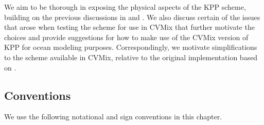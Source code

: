 We aim to be thorough in exposing the physical aspects of the KPP
scheme, building on the previous discussions in \cite{LargeKPP} and
\cite{Large2012}.  We also discuss certain of the issues that arose
when testing the scheme for use in CVMix that further motivate the
choices and provide suggestions for how to make use of the CVMix
version of KPP for ocean modeling purposes. Correspondingly, we
motivate simplifications to the scheme available in CVMix, relative to
the original implementation based on \cite{LargeKPP}.


\subsection{Conventions}
\label{subsection:conventions}

We use the following notational and sign conventions in this chapter. 

